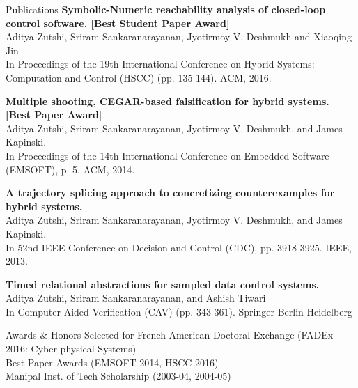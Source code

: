 \documentclass{resume} %
\begin{document}
\begin{rSection}{Publications}
\textbf{Symbolic-Numeric reachability analysis of closed-loop control software. [Best Student Paper Award]}\\
Aditya Zutshi, Sriram Sankaranarayanan, Jyotirmoy V. Deshmukh and Xiaoqing Jin\\
In Proceedings of the 19th International Conference on Hybrid Systems: Computation and Control (HSCC) (pp. 135-144). ACM, 2016.

\textbf{Multiple shooting, CEGAR-based falsification for hybrid systems. [Best Paper Award]}\\
Aditya Zutshi, Sriram Sankaranarayanan, Jyotirmoy V. Deshmukh, and James Kapinski.\\
In Proceedings of the 14th International Conference on Embedded Software (EMSOFT), p. 5. ACM, 2014.

\textbf{A trajectory splicing approach to concretizing counterexamples for hybrid systems.}\\
Aditya Zutshi, Sriram Sankaranarayanan, Jyotirmoy V. Deshmukh, and James Kapinski.\\
In 52nd IEEE Conference on Decision and Control (CDC), pp. 3918-3925. IEEE, 2013.

\textbf{Timed relational abstractions for sampled data control systems.}\\
Aditya Zutshi, Sriram Sankaranarayanan, and Ashish Tiwari\\
In Computer Aided Verification (CAV) (pp. 343-361). Springer Berlin Heidelberg

\end{rSection}


\begin{rSection}{Awards \& Honors}
Selected for French-American Doctoral Exchange (FADEx 2016: Cyber-physical Systems)\\
Best Paper Awards (EMSOFT 2014, HSCC 2016)\\
Manipal Inst. of Tech Scholarship (2003-04, 2004-05)
\end{rSection}
\end{document}
